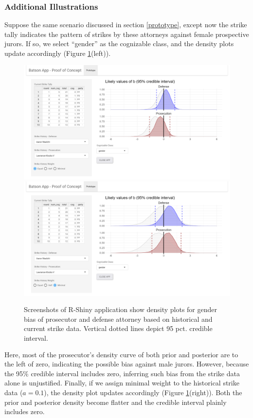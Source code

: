 \documentclass[12pt]{article}
\begin{document}
\hypertarget{additional-illustrations}{%
\subsubsection{Additional Illustrations}\label{additional-illustrations}}

Suppose the same scenario discussed in section \ref{prototype}, except now the strike tally indicates the pattern of strikes by these attorneys against female prospective jurors. If so, we select ``gender'' as the cognizable class, and the density plots update accordingly (Figure \ref{fig:figapp3}(left)).

\begin{figure}
\includegraphics[width=0.5\linewidth]{../figures/batson_app_screenshots/batson_app_screenshot3} \includegraphics[width=0.5\linewidth]{../figures/batson_app_screenshots/batson_app_screenshot4} \caption{Screenshots of R-Shiny application show density plots for gender bias of prosecutor and defense attorney based on historical and current strike data. Vertical dotted lines depict 95 pct. credible interval.}\label{fig:figapp3}
\end{figure}

Here, most of the prosecutor's density curve of both prior and posterior are to the left of zero, indicating the possible bias against male jurors. However, because the 95\% credible interval includes zero, inferring such bias from the strike data alone is unjustified. Finally, if we assign minimal weight to the historical strike data (\(a = 0.1\)), the density plot updates accordingly (Figure \ref{fig:figapp3}(right)). Both the prior and posterior density become flatter and the credible interval plainly includes zero.
\end{document}
